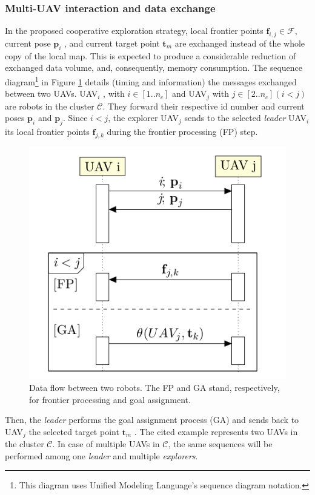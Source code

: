 \documentclass[11pt,openany]{book}
\begin{document}
\begin{algorimth}[H]
\subsubsection{Multi-UAV interaction and data exchange}
In the proposed cooperative exploration strategy, local frontier points $\mathbf{f}_{i,j} \in \mathcal{F}$, current pose $\mathbf{p}_i$ , and current target point $\mathbf{t}_m$ are exchanged instead of the whole copy of the local map. This is expected to produce a considerable reduction of exchanged data volume, and, consequently, memory consumption. The sequence diagram\footnote{This diagram uses Unified Modeling Language's sequence diagram notation.} in Figure \ref{fig:4.5} details (timing and information) the messages exchanged between two UAVs. UAV$_i$ , with $i \in [1..n_c]$ and UAV$_j$ with $j \in [2..n_c] (i<j)$ are robots in the cluster $\mathcal{C}$. They forward their respective id number and current poses $\mathbf{p}_i$ and $\mathbf{p}_j$. Since $i < j$, the explorer UAV$_j$ sends to the selected \textit{leader} UAV$_i$ its local frontier points $\mathbf{f}_{j,k}$ during the frontier processing (FP) step.
\begin{figure}[H]
    \centering
    \includegraphics[scale=0.5]{assets/4_5.png}
    \caption{Data ﬂow between two robots. The FP and GA stand, respectively, for frontier processing and goal assignment.}
    \label{fig:4.5}
\end{figure}
Then, the \textit{leader} performs the goal assignment process (GA) and sends back to UAV$_j$ the selected target point $\mathbf{t}_m$ . The cited example represents two UAVs in the cluster $\mathcal{C}$. In case of multiple UAVs in $\mathcal{C}$, the same sequences will be performed among one \textit{leader} and multiple \textit{explorers}.

\end{algorimth}
\end{document}

